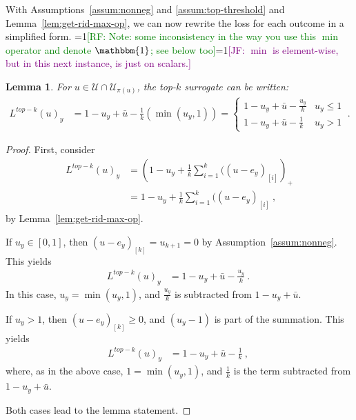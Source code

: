 \documentclass[12pt]{article}
\newcommand{\Comments}{1}
\newcommand{\mynote}[2]{\ifnum\Comments=1\textcolor{#1}{#2}\fi}
\newcommand{\raf}[1]{\mynote{green}{[RF: #1]}}
\newcommand{\jessie}[1]{\mynote{purple}{[JF: #1]}}
\newcommand{\ubar}{\bar{u}}
\newcommand{\U}{\mathcal{U}}
\newcommand{\ones}{\mathbbm{1}}
\newtheorem{lemma}{Lemma}
\begin{document}
With Assumptions~\ref{assum:nonneg} and \ref{assum:top-threshold} and Lemma~\ref{lem:get-rid-max-op}, we can now rewrite the loss for each outcome in a simplified form.
\raf{Note: some inconsistency in the way you use this $\min$ operator and denote $\ones$; see below too}\jessie{$\min$ is element-wise, but in this next instance, is just on scalars.}
\begin{lemma}\label{lem:new-form-surrogate}
	For $u \in \U \cap \U_{\pi(u)}$, the top-$k$ surrogate can be written:
\begin{align*} 
L^{top-k}(u)_y  &= 1 - u_y + \bar u - \frac{1}{k}(\min(u_y, 1)) = \begin{cases}
1 - u_y + \bar u - \frac{u_y}{k} & u_y \leq 1\\
1 - u_y + \bar u - \frac{1}{k} & u_y > 1
\end{cases}
~.~
\end{align*}
\end{lemma}
\begin{proof}
	First, consider
\begin{align*}
	L^{top-k}(u)_y &= \left(1 -u_y + \frac{1}{k} \sum_{i=1}^k ((u - e_y)_{[i]} \right)_+\\
	&= 1 -u_y + \frac{1}{k} \sum_{i=1}^k ((u - e_y)_{[i]}~,
	\end{align*}
	by Lemma~\ref{lem:get-rid-max-op}.

	
	If $u_y \in [0,1]$, then $(u-e_y)_{[k]} = u_{k+1} = 0$ by Assumption~\ref{assum:nonneg}.
	This yields
	\begin{align*}
	L^{top-k}(u)_y &= 1 - u_y + \bar u - \frac{u_y}{k}~.~
	\end{align*}
	In this case, $u_y = \min(u_y, 1)$, and $\frac {u_y}{k}$ is subtracted from $1 - u_y + \bar u$.

	If $u_y > 1$, then $(u-e_y)_{[k]} \geq 0$, and $(u_y - 1)$ is part of the summation.
	This yields
	\begin{align*}
	L^{top-k}(u)_y &= 1 - u_y + \bar u - \frac{1}{k}~,~
	\end{align*}
	where, as in the above case, $1 = \min(u_y, 1)$, and $\frac{1}{k}$ is the term subtracted from $1 - u_y + \bar u$.
	
	Both cases lead to the lemma statement.
\end{proof}


%
%
\end{document}
